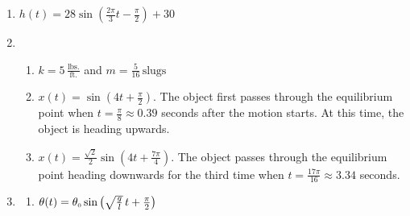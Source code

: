 \begin{enumerate}




\item  $h(t) = 28\sin\left(\frac{2\pi}{3} t - \frac{\pi}{2}\right) + 30$

\item  \begin{enumerate} \item $k = 5 \, \frac{\text{lbs.}}{\text{ft.}}$ and $m = \frac{5}{16} \, \text{slugs}$

\item  $x(t) = \sin\left(4t + \frac{\pi}{2}\right)$.  The object first passes through the equilibrium point when $t = \frac{\pi}{8} \approx 0.39$ seconds after the motion starts.  At this time, the object is heading upwards.

\item  $x(t) = \frac{\sqrt{2}}{2} \sin\left(4t + \frac{7\pi}{4}\right)$.  The object passes through the equilibrium point heading downwards for the third time when $t = \frac{17\pi}{16} \approx 3.34$ seconds.


\end{enumerate}

\item  \begin{multicols}{2}

\begin{enumerate}

\item  $\theta(t) = \theta_{\text{\tiny $0$}} \sin\left(\sqrt{\frac{g}{l}}\, t + \frac{\pi}{2}\right)$


\end{enumerate}
\end{multicols}
\end{enumerate}
